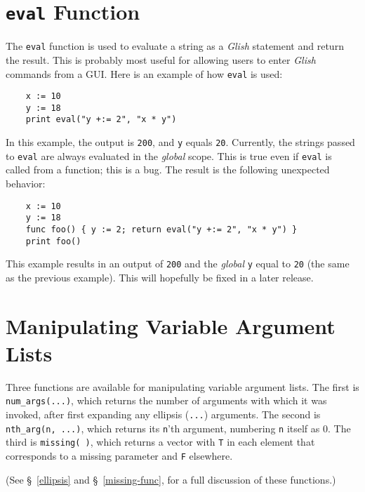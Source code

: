 
\section{{\tt eval} Function}
\label{eval-func}
The {\tt eval} function is used to evaluate a string as a {\em Glish}  statement and
return the result. This is probably most useful for allowing users
to enter {\em Glish} commands from a GUI. Here is an example of how {\tt eval} is used:
\begin{verbatim}
    x := 10
    y := 18
    print eval("y +:= 2", "x * y")
\end{verbatim}
In this example, the output is {\tt 200}, and {\tt y} equals {\tt 20}.
Currently, the strings passed to {\tt eval} are always evaluated in the {\em global}
scope. This is true even if {\tt eval} is called from a function; this is a bug. The
result is the following unexpected behavior: 
\begin{verbatim}
    x := 10
    y := 18
    func foo() { y := 2; return eval("y +:= 2", "x * y") }
    print foo()
\end{verbatim}
This example results in an output of {\tt 200} and the {\em global} {\tt y} equal to
{\tt 20} (the same as the previous example). This will hopefully be fixed in a
later release.

\section{Manipulating Variable Argument Lists}

Three functions are available for manipulating variable argument lists.
The first is {\tt num\_args(...)}, which returns the number of arguments
with which it was invoked, after first expanding any ellipsis ({\tt ...}) arguments.
The second is {\tt nth\_arg(n, ...)}, which returns its {\tt n}'th argument,
numbering {\tt n} itself as 0.
The third is {\tt missing( )}, which returns a vector with {\tt T} in each
element that corresponds to a missing parameter and {\tt F} elsewhere.

(See \S~\ref{ellipsis} and \S~\ref{missing-func}, for a full discussion of these
functions.)

